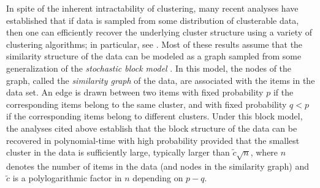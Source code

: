\documentclass[twoside,11pt]{article}
\newcommand{\0}{\bs{0}}
\begin{document}
In spite of the inherent intractability of clustering, %
many recent analyses have established that if
data is sampled from some distribution of clusterable data, then one can efficiently recover the underlying
cluster structure using a variety of clustering algorithms; 
in particular, see  \citet{ abbe2016exact,  ailon2013breaking, ames2014convex, ames2014guaranteed, amini2014semidefinite, cai2015robust, chen2014clustering, chen2014improved, chen2014statistical, guedon2015community, hajek2015achieving, 
lei2015consistency,  mathieu2010correlation,nellore2013recovery, oymak2011finding,rohe2011spectral, qin2013regularized, vinayak2014sharp}.
Most of these results assume that the similarity structure of the data can be 
modeled as a graph sampled from some
generalization of the 
\emph{stochastic block model} \citep{holland1983stochastic}. In this model, the nodes of the graph, called the \emph{similarity graph} of the data, are associated with the items in the data set. An edge is drawn between two items with fixed probability $p$ if the corresponding items belong to the same cluster, and with fixed probability $q < p$ if the corresponding items belong to different clusters. %
Under this block model, the analyses cited above establish
 that the block structure of the data can be recovered in polynomial-time 
 with high probability
provided that the smallest cluster in the data is sufficiently large, typically larger than \( \tilde c \sqrt{n} \), where \(n\)
denotes the number of items in the data (and nodes in the similarity graph) and \(\tilde c \) is a polylogarithmic factor in \(n\)
depending on \(p - q \).
\end{document}
